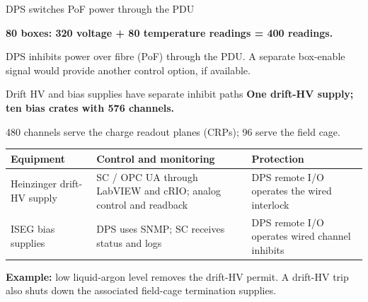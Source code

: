 \documentclass[aspectratio=169,11pt]{beamer}
\begin{document}
\begin{frame}{DPS switches PoF power through the PDU}
\centering

\par\smallskip
\raggedright{}\par\smallskip
\raggedright

\textbf{80 boxes: 320 voltage + 80 temperature readings = 400 readings.}\par\medskip
DPS inhibits power over fibre (PoF) through the PDU. A separate box-enable signal would provide another control option, if available.
\end{frame}

\begin{frame}{Drift HV and bias supplies have separate inhibit paths}
\textbf{One drift-HV supply; ten bias crates with 576 channels.}\par
480 channels serve the charge readout planes (CRPs); 96 serve the field cage.\par\bigskip
\renewcommand{\arraystretch}{1.35}
\begin{tabularx}{\textwidth}{@{}>{\RaggedRight\arraybackslash}p{2.1cm}>{\RaggedRight\arraybackslash}X>{\RaggedRight\arraybackslash}X@{}}
\toprule
\textbf{Equipment} & \textbf{Control and monitoring} & \textbf{Protection}\\\midrule
Heinzinger drift-HV supply & SC / OPC UA through LabVIEW and cRIO; analog control and readback & DPS remote I/O operates the wired interlock\\
ISEG bias supplies & DPS uses SNMP; SC receives status and logs & DPS remote I/O operates wired channel inhibits\\
\bottomrule
\end{tabularx}\par\bigskip
\textbf{Example:} low liquid-argon level removes the drift-HV permit. A drift-HV trip also shuts down the associated field-cage termination supplies.
\end{frame}
\end{document}
